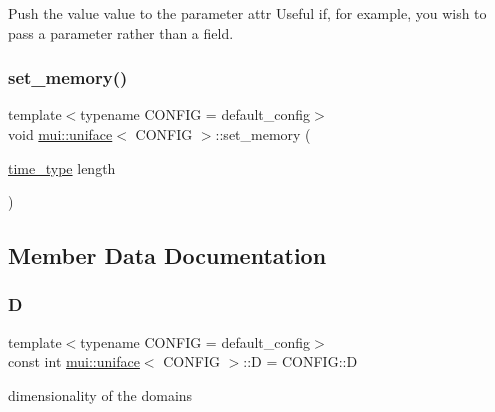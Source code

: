 Push the value {\ttfamily value} to the parameter {\ttfamily attr} Useful if, for example, you wish to pass a parameter rather than a field. 

\mbox{\label{classmui_1_1uniface_adf78a7f854d37527fccca00a8a4d02aa}} 
\subsubsection{\texorpdfstring{set\+\_\+memory()}{set\_memory()}}
{\footnotesize\ttfamily template$<$typename C\+O\+N\+F\+IG  = default\+\_\+config$>$ \\
void \hyperlink{classmui_1_1uniface}{mui\+::uniface}$<$ C\+O\+N\+F\+IG $>$\+::set\+\_\+memory (\begin{DoxyParamCaption}\item[{\hyperlink{classmui_1_1uniface_a65cbecf1936d7d61cb45f14b1138dc07}{time\+\_\+type}}]{length }\end{DoxyParamCaption})\hspace{0.3cm}{\ttfamily [inline]}}



\subsection{Member Data Documentation}
\mbox{\label{classmui_1_1uniface_ad07ef49eaa55f7db5da324edff430032}} 
\subsubsection{\texorpdfstring{D}{D}}
{\footnotesize\ttfamily template$<$typename C\+O\+N\+F\+IG  = default\+\_\+config$>$ \\
const int \hyperlink{classmui_1_1uniface}{mui\+::uniface}$<$ C\+O\+N\+F\+IG $>$\+::D = C\+O\+N\+F\+I\+G\+::D\hspace{0.3cm}{\ttfamily [static]}}



dimensionality of the domains 

\mbox{\label{classmui_1_1uniface_a45811234a0e40931f9fcf2a966795c3e}} 
